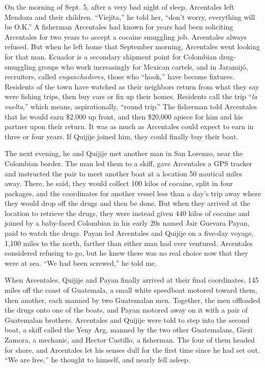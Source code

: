 On the morning of Sept. 5, after a very bad night of sleep, Arcentales
left Mendoza and their children. ``Viejita,'' he told her, ``don't
worry, everything will be O.K.'' A fisherman Arcentales had known for
years had been soliciting Arcentales for two years to accept a cocaine
smuggling job. Arcentales always refused. But when he left home that
September morning, Arcentales went looking for that man. Ecuador is a
secondary shipment point for Colombian drug-smuggling groups who work
increasingly for Mexican cartels, and in Jaramijó, recruiters, called
\emph{enganchadores}, those who ``hook,'' have become fixtures.
Residents of the town have watched as their neighbors return from what
they say were fishing trips, then buy cars or fix up their homes.
Residents call the trip ``\emph{la vuelta},'' which means,
aspirationally, ``round trip.'' The fisherman told Arcentales that he
would earn \$2,000 up front, and then \$20,000 apiece for him and his
partner upon their return. It was as much as Arcentales could expect to
earn in three or four years. If Quijije joined him, they could finally
buy their boat.

The next evening, he and Quijije met another man in San Lorenzo, near
the Colombian border. The man led them to a skiff, gave Arcentales a GPS
tracker and instructed the pair to meet another boat at a location 50
nautical miles away. There, he said, they would collect 100 kilos of
cocaine, split in four packages, and the coordinates for another vessel
less than a day's trip away where they would drop off the drugs and then
be done. But when they arrived at the location to retrieve the drugs,
they were instead given 440 kilos of cocaine and joined by a baby-faced
Colombian in his early 20s named Jair Guevara Payan, paid to watch the
drugs. Payan led Arcentales and Quijije on a five-day voyage, 1,100
miles to the north, farther than either man had ever ventured.
Arcentales considered refusing to go, but he knew there was no real
choice now that they were at sea. ``We had been screwed,'' he told me.

When Arcentales, Quijije and Payan finally arrived at their final
coordinates, 145 miles off the coast of Guatemala, a small white
speedboat motored toward them, then another, each manned by two
Guatemalan men. Together, the men offloaded the drugs onto one of the
boats, and Payan motored away on it with a pair of Guatemalan brothers.
Arcentales and Quijije were told to step into the second boat, a skiff
called the Yeny Arg, manned by the two other Guatemalans, Giezi Zamora,
a mechanic, and Hector Castillo, a fisherman. The four of them headed
for shore, and Arcentales let his senses dull for the first time since
he had set out. ``We are free,'' he thought to himself, and nearly fell
asleep.

